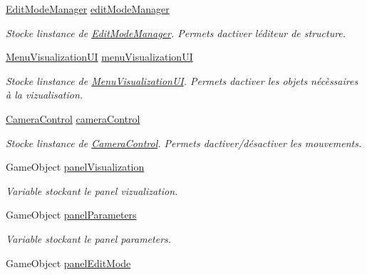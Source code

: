 \begin{DoxyCompactItemize}
\item 
\mbox{\hyperlink{class_edit_mode_manager}{Edit\+Mode\+Manager}} \mbox{\hyperlink{class_navigation_a59344933bd9a22b16612407dee4e8aa5}{edit\+Mode\+Manager}}
\begin{DoxyCompactList}\small\item\em Stocke l\textquotesingle{}instance de \mbox{\hyperlink{class_edit_mode_manager}{Edit\+Mode\+Manager}}. Permets d\textquotesingle{}activer l\textquotesingle{}éditeur de structure. \end{DoxyCompactList}\item 
\mbox{\hyperlink{class_menu_visualization_u_i}{Menu\+Visualization\+UI}} \mbox{\hyperlink{class_navigation_affdf26928cacf9c7582cb21ff6bf85dd}{menu\+Visualization\+UI}}
\begin{DoxyCompactList}\small\item\em Stocke l\textquotesingle{}instance de \mbox{\hyperlink{class_menu_visualization_u_i}{Menu\+Visualization\+UI}}. Permets d\textquotesingle{}activer les objets nécèssaires à la vizualisation. \end{DoxyCompactList}\item 
\mbox{\hyperlink{class_camera_control}{Camera\+Control}} \mbox{\hyperlink{class_navigation_a8ee62aef67edcc54d1478d20c22fff12}{camera\+Control}}
\begin{DoxyCompactList}\small\item\em Stocke l\textquotesingle{}instance de \mbox{\hyperlink{class_camera_control}{Camera\+Control}}. Permets d\textquotesingle{}activer/désactiver les mouvements. \end{DoxyCompactList}\item 
Game\+Object \mbox{\hyperlink{class_navigation_a87c0235e826c5cd805b95b81c8c55ceb}{panel\+Visualization}}
\begin{DoxyCompactList}\small\item\em Variable stockant le panel vizualization. \end{DoxyCompactList}\item 
Game\+Object \mbox{\hyperlink{class_navigation_ae85a69c809b880b39ac4cb86f2d80258}{panel\+Parameters}}
\begin{DoxyCompactList}\small\item\em Variable stockant le panel parameters. \end{DoxyCompactList}\item 
Game\+Object \mbox{\hyperlink{class_navigation_aa095d3e8d992350e8452f4c91ca607c9}{panel\+Edit\+Mode}}

\end{DoxyCompactItemize}
